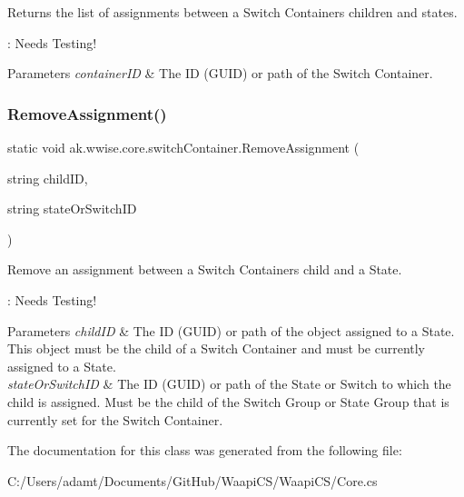 Returns the list of assignments between a Switch Container\textquotesingle{}s children and states. 

\+: Needs Testing!


\begin{DoxyParams}{Parameters}
{\em container\+ID} & The ID (G\+U\+ID) or path of the Switch Container.\\
\hline
\end{DoxyParams}
\mbox{\label{classak_1_1wwise_1_1core_1_1switch_container_a54352aa359957b104c3d499943d979b1}} 
\subsubsection{\texorpdfstring{Remove\+Assignment()}{RemoveAssignment()}}
{\footnotesize\ttfamily static void ak.\+wwise.\+core.\+switch\+Container.\+Remove\+Assignment (\begin{DoxyParamCaption}\item[{string}]{child\+ID,  }\item[{string}]{state\+Or\+Switch\+ID }\end{DoxyParamCaption})\hspace{0.3cm}{\ttfamily [static]}}



Remove an assignment between a Switch Container\textquotesingle{}s child and a State. 

\+: Needs Testing!


\begin{DoxyParams}{Parameters}
{\em child\+ID} & The ID (G\+U\+ID) or path of the object assigned to a State. This object must be the child of a Switch Container and must be currently assigned to a State.\\
\hline
{\em state\+Or\+Switch\+ID} & The ID (G\+U\+ID) or path of the State or Switch to which the child is assigned. Must be the child of the Switch Group or State Group that is currently set for the Switch Container.\\
\hline
\end{DoxyParams}


The documentation for this class was generated from the following file\+:\begin{DoxyCompactItemize}
\item 
C\+:/\+Users/adamt/\+Documents/\+Git\+Hub/\+Waapi\+C\+S/\+Waapi\+C\+S/Core.\+cs\end{DoxyCompactItemize}

